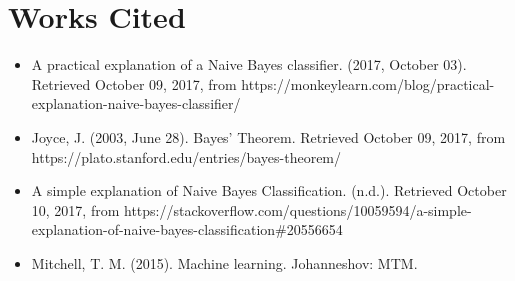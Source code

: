 \documentclass[format=acmlarge]{acmart}
\begin{document}
\section{Works Cited}
\begin{itemize}
\item A practical explanation of a Naive Bayes classifier. (2017, October 03). Retrieved October 09, 2017, from https://monkeylearn.com/blog/practical-explanation-naive-bayes-classifier/
\item Joyce, J. (2003, June 28). Bayes' Theorem. Retrieved October 09, 2017, from https://plato.stanford.edu/entries/bayes-theorem/
\item A simple explanation of Naive Bayes Classification. (n.d.). Retrieved October 10, 2017, from https://stackoverflow.com/questions/10059594/a-simple-explanation-of-naive-bayes-classification\#20556654
\item Mitchell, T. M. (2015). Machine learning. Johanneshov: MTM.
\end{itemize}
\end{document}
